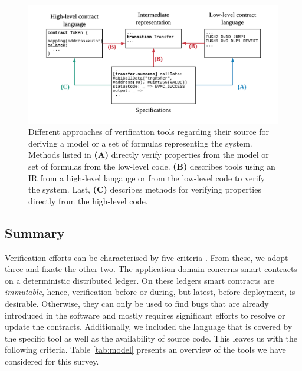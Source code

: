 \documentclass{llncs}
\begin{document}
\begin{figure}
\label{fig:ver}
\includegraphics[width=\textwidth]{fig/Verification.pdf}
\caption{Different approaches of verification tools regarding their source for deriving a model or a set of formulas representing the system. Methods listed in \textbf{(A)} directly verify properties from the model or set of formulas from the low-level code. \textbf{(B)} describes tools using an IR from a high-level langauge or from the low-level code to verify the system. Last, \textbf{(C)} describes methods for verifying properties directly from the high-level code.}
\end{figure}

\subsection{Summary}

Verification efforts can be characterised by five criteria \cite[173]{Huth2004}. From these, we adopt three and fixate the other two. 
The application domain concerns smart contracts on a deterministic distributed ledger.
On these ledgers smart contracts are \emph{immutable}, hence, verification before or during, but latest, before deployment, is desirable. Otherwise, they can only be used to find bugs that are already introduced in the software and mostly requires significant efforts to resolve or update the contracts.
Additionally, we included the language that is covered by the specific tool as well as the availability of source code.
This leaves us with the following criteria.
Table \ref{tab:model} presents an overview of the tools we have considered for this survey.
\end{document}
